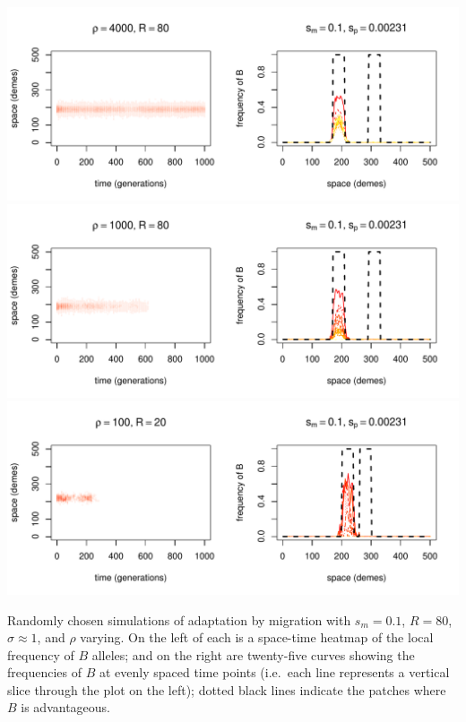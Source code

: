 \documentclass{article}
\begin{document}
\begin{sfigure}
  \begin{center}
    \includegraphics{example-migration-sims/89826-r1-501-sb0_01-sm-0_1-N4000-pophistory-run}
    \includegraphics{example-migration-sims/76178-r1-501-sb0_01-sm-0_1-N1000-pophistory-run}
    \includegraphics{example-migration-sims/95095-r1-501-sb0_01-sm-0_1-N100-pophistory-run}
  \end{center}
  \caption{
    Randomly chosen simulations of adaptation by migration
    with $s_m=0.1$, $R=80$, $\sigma\approx 1$, and $\rho$ varying.
    On the left of each is a space-time heatmap of the local frequency of $B$ alleles;
    and on the right are twenty-five curves showing the frequencies of $B$ at evenly spaced time points
    (i.e.\ each line represents a vertical slice through the plot on the left);
    dotted black lines indicate the patches where $B$ is advantageous.
  } \label{sfig:sims_5}
\end{sfigure}
\end{document}
